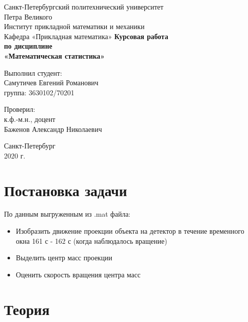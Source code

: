 \documentclass[12pt,a4paper]{article}
\begin{document}
	
\begin{titlepage}
	\begin{center}		
		\vfill	
		Санкт-Петербургский политехнический университет \\
		Петра Великого\\
		\vskip 1cm
		Институт прикладной математики и механики \\
		Кафедра «Прикладная математика»
		\vfill
		\textbf{Курсовая работа\\
			по дисциплине\\
			«Математическая статистика»\\}
		\vfill
	\end{center}
	\vfill
	\hfill
	\begin{minipage}{0.4\textwidth}
		Выполнил студент:\\
		Самутичев Евгений Романович\\
		группа: 3630102/70201\\
	\end{minipage}
	\vfill
	\hfill 
	\begin{minipage}{0.4\textwidth}
		Проверил:\\
		к.ф.-м.н., доцент\\
		Баженов Александр Николаевич\
	\end{minipage}
	\vfill
	\begin{center}
		Санкт-Петербург\\2020 г.
	\end{center}
\end{titlepage}

\tableofcontents
\listoffigures
\pagebreak

\section{Постановка задачи}
По данным выгруженным из .mat файла:
\begin{itemize}
	\item Изобразить движение проекции объекта на детектор в течение временного окна 161 с - 162 с (когда наблюдалось вращение)
	\item Выделить центр масс проекции
	\item Оценить скорость вращения центра масс
\end{itemize}
\pagebreak

\section{Теория}
\end{document}
